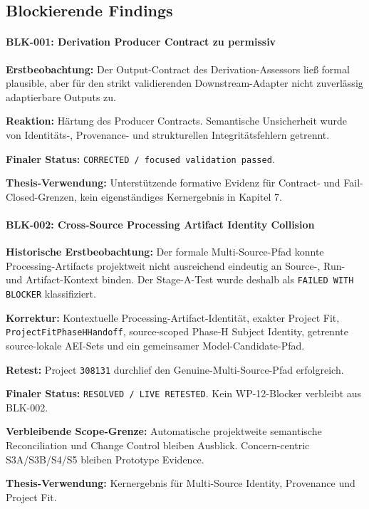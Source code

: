 \subsection{Blockierende Findings}

\paragraph{BLK-001: Derivation Producer Contract zu permissiv}

\textbf{Erstbeobachtung:}
Der Output-Contract des Derivation-Assessors ließ formal plausible, aber für den
strikt validierenden Downstream-Adapter nicht zuverlässig adaptierbare Outputs zu.

\textbf{Reaktion:}
Härtung des Producer Contracts. Semantische Unsicherheit wurde von
Identitäts-, Provenance- und strukturellen Integritätsfehlern getrennt.

\textbf{Finaler Status:}
\texttt{CORRECTED / focused validation passed}.

\textbf{Thesis-Verwendung:}
Unterstützende formative Evidenz für Contract- und Fail-Closed-Grenzen, kein
eigenständiges Kernergebnis in Kapitel 7.


\paragraph{BLK-002: Cross-Source Processing Artifact Identity Collision}

\textbf{Historische Erstbeobachtung:}
Der formale Multi-Source-Pfad konnte Processing-Artifacts projektweit nicht
ausreichend eindeutig an Source-, Run- und Artifact-Kontext binden.
Der Stage-A-Test wurde deshalb als \texttt{FAILED WITH BLOCKER} klassifiziert.

\textbf{Korrektur:}
Kontextuelle Processing-Artifact-Identität, exakter Project Fit,
\texttt{ProjectFitPhaseHHandoff}, source-scoped Phase-H Subject Identity,
getrennte source-lokale AEI-Sets und ein gemeinsamer Model-Candidate-Pfad.

\textbf{Retest:}
Project \texttt{308131} durchlief den Genuine-Multi-Source-Pfad erfolgreich.

\textbf{Finaler Status:}
\texttt{RESOLVED / LIVE RETESTED}. Kein WP-12-Blocker verbleibt aus BLK-002.

\textbf{Verbleibende Scope-Grenze:}
Automatische projektweite semantische Reconciliation und Change Control bleiben
Ausblick. Concern-centric S3A/S3B/S4/S5 bleiben Prototype Evidence.

\textbf{Thesis-Verwendung:}
Kernergebnis für Multi-Source Identity, Provenance und Project Fit.


